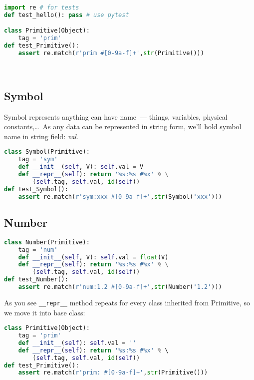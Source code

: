 \bigskip
\begin{lstlisting}[language=Python]
import re # for tests
def test_hello(): pass # use pytest

class Primitive(Object):
    tag = 'prim'
def test_Primitive():
    assert re.match(r'prim #[0-9a-f]+',str(Primitive()))
\end{lstlisting}

\ \\

\subsection{Symbol}

Symbol represents anything can have name\ --- things, variables,
physical constants,\ldots\ As any data can be represented in string form, we'll
hold symbol name in string field: \emph{val}.


\begin{lstlisting}[language=Python]
class Symbol(Primitive):
    tag = 'sym'
    def __init__(self, V): self.val = V
    def __repr__(self): return '%s:%s #%x' % \
    	(self.tag, self.val, id(self))
def test_Symbol():
    assert re.match(r'sym:xxx #[0-9a-f]+',str(Symbol('xxx')))
\end{lstlisting}

\subsection{Number}


\begin{lstlisting}[language=Python]
class Number(Primitive):
    tag = 'num'
    def __init__(self, V): self.val = float(V)
    def __repr__(self): return '%s:%s #%x' % \
    	(self.tag, self.val, id(self))
def test_Number():
    assert re.match(r'num:1.2 #[0-9a-f]+',str(Number('1.2')))
\end{lstlisting}
As you see \verb|__repr__| method repeats for every class inherited from
Primitive, so we move it into base class:

\begin{lstlisting}[language=Python]
class Primitive(Object):
    tag = 'prim'
    def __init__(self): self.val = ''
    def __repr__(self): return '%s:%s #%x' % \ 
    	(self.tag, self.val, id(self))
def test_Primitive():
    assert re.match(r'prim: #[0-9a-f]+',str(Primitive()))
\end{lstlisting}
 
